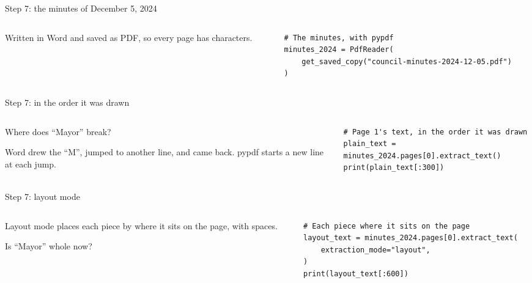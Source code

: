 \documentclass[9pt,aspectratio=169]{beamer}
\begin{document}
\begin{frame}[fragile]{Step 7: the minutes of December 5, 2024}
    \begin{columns}[T]
        \begin{column}{0.37\textwidth}
            Written in Word and saved as PDF, so every page has characters.
        \end{column}
        \begin{column}{0.6\textwidth}
\begin{lstlisting}
# The minutes, with pypdf
minutes_2024 = PdfReader(
    get_saved_copy("council-minutes-2024-12-05.pdf")
)
\end{lstlisting}
        \end{column}
    \end{columns}
\end{frame}

\begin{frame}[fragile]{Step 7: in the order it was drawn}
    \begin{columns}[T]
        \begin{column}{0.37\textwidth}
            Where does ``Mayor'' break?

            \medskip
            Word drew the ``M'', jumped to another line, and came back. pypdf starts a new line at each jump.
        \end{column}
        \begin{column}{0.6\textwidth}
\begin{lstlisting}
# Page 1's text, in the order it was drawn
plain_text = minutes_2024.pages[0].extract_text()
print(plain_text[:300])
\end{lstlisting}
        \end{column}
    \end{columns}
\end{frame}

\begin{frame}[fragile]{Step 7: layout mode}
    \begin{columns}[T]
        \begin{column}{0.37\textwidth}
            Layout mode places each piece by where it sits on the page, with spaces.

            \medskip
            Is ``Mayor'' whole now?
        \end{column}
        \begin{column}{0.6\textwidth}
\begin{lstlisting}
# Each piece where it sits on the page
layout_text = minutes_2024.pages[0].extract_text(
    extraction_mode="layout",
)
print(layout_text[:600])
\end{lstlisting}
        \end{column}
    \end{columns}
\end{frame}
\end{document}
